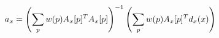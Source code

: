 \begin{equation}
    \footnotesize
    \label{eq:optimal-parameter-affine-weighted-halved}
    a_x = \left (\sum_p w(p) A_x[p]^T A_x[p] \right )^{-1} \left (\sum_p w(p) A_x[p]^T d_x(x) \right)
\end{equation}